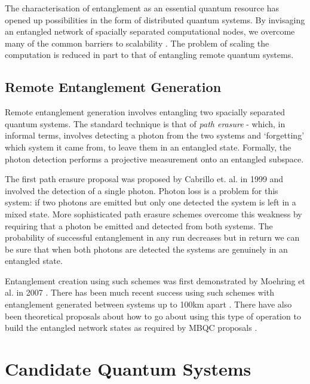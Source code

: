 The characterisation of entanglement as an essential quantum resource has opened up possibilities in the form of distributed quantum systems. By invisaging an entangled network of spacially separated computational nodes, we overcome many of the common barriers to scalability \cite{distributed_qip_review_08}. The problem of scaling the computation is reduced in part to that of entangling remote quantum systems.

\subsection{Remote Entanglement Generation}\label{remote_entanglement_generation}

Remote entanglement generation involves entangling two spacially separated quantum systems. The standard technique is that of \textit{path erasure} - which, in informal terms, involves detecting a photon from the two systems and `forgetting' which system it came from, to leave them in an entangled state. Formally, the photon detection performs a projective measurement onto an entangled subspace.

The first path erasure proposal was proposed by Cabrillo et. al. \cite{basic_path_erasure} in 1999 and involved the detection of a single photon. Photon loss is a problem for this system: if two photons are emitted but only one detected the system is left in a mixed state. More sophisticated path erasure schemes \cite{double_hearald_1, double_hearald_2, barrett+kok, double_hearald_3} overcome this weakness by requiring that a photon be emitted and detected from both systems. The probability of successful entanglement in any run decreases but in return we can be sure that when both photons are detected the systems are genuinely in an entangled state. 

Entanglement creation using such schemes was first demonstrated by Moehring et al. in 2007 \cite{Moehring:2007p6099}. There has been much recent success using such schemes with entanglement generated between systems up to 100km apart \cite{entanglement_97km_08, entanglement_144km_07}. There have also been theoretical proposals about how to go about using this type of operation to build the entangled network states as required by MBQC proposals \cite{Benjamin:2006p6123}.


\section{Candidate Quantum Systems}

